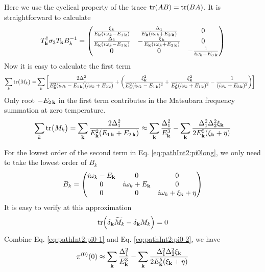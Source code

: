 Here we use the cyclical  property of the trace $\text{tr}(AB)=\text{tr}(BA)$.  
It is straightforward to calculate
\begin{equation*}
T_{\mathbf{k}}^{\dagger}\sigma_3T_{\mathbf{k}}B_{k}^{-1}=
\begin{pmatrix}
{\frac{\xi_{\ensuremath{\mathbf{k}}}}{E_{\ensuremath{\mathbf{k}}}(i\omega_{k}-E_{1\,\ensuremath{\mathbf{k}}})}}&\frac{\Delta_{1}}{E_{\mathbf{k}}(i\omega_{k}+E_{2\,\mathbf{k}})}&0\\
{\frac{\Delta_{1}}{E_{\mathbf{k}}(i\omega_{k}-E_{1\,\mathbf{k}})}}&-\frac{\xi_{\mathbf{k}}}{E_{\mathbf{k}}(i\omega_{k}+E_{2\,\mathbf{k}})}&0\\
0&0&-\frac{1}{i\omega_{k}+E_{3\,\mathbf{k}}}\\
\end{pmatrix}
\end{equation*}
Now it is easy to calculate the first term
\begin{equation}
\begin{split}
\sum_k\text{tr}\big(M_{k}\big)=&
\sum_{k}\left[
\frac{2\Delta_{1}^{2}}{E_{\mathbf{k}}^{2}(i\omega_{k}-E_{1\,\mathbf{k}})(i\omega_{k}+E_{2\,\mathbf{k}})}+
\left(\frac{\xi_{\mathbf{k}}^{2}}{E_{\mathbf{k}}^{2}(i\omega_{k}-E_{1\,\mathbf{k}})^{2}}+\frac{\xi_{\mathbf{k}}^{2}}{E_{\mathbf{k}}^{2}(i\omega_{k}+E_{1\,\mathbf{k}})^{2}}
-\frac{1}{(i\omega_{k}+E_{3\,\mathbf{k}})^{2}}\right)
\right]
\end{split}
\end{equation}
Only root $-E_{2\,\mathbf{k}}$ in the first term contributes in the Matsubara frequency summation at zero temperature.
\begin{equation}\label{eq:pathInt2:pi0-1}
\sum_k\text{tr}\big(M_{k}\big)=\sum_{\mathbf{k}}\frac{2\Delta_{1}^{2}}{E_{\mathbf{k}}^{2}(E_{1\,\mathbf{k}}+E_{2\,\mathbf{k}})}
\approx\sum_{\mathbf{k}}\frac{\Delta_{1}^{2}}{E_{\mathbf{k}}^{3}}-\sum_{\mathbf{k}}\frac{\Delta_{1}^{2}\Delta_{2}^{2}\xi_{\mathbf{k}}}{2E_{\mathbf{k}}^{5}(\xi_{\mathbf{k}}+\eta)}
\end{equation}

For the lowest order of the second term in Eq. \eqref{eq:pathInt2:pi0long}, we only need to take the lowest order of $B_{k}$
\begin{equation}
B_{k}=\begin{pmatrix}i\omega_{k}-E_{\mathbf{k}}&0&0\\0&i\omega_{k}+E_{\mathbf{k}}&0\\0&0&i\omega_{k}+\xi_{\mathbf{k}}+\eta\end{pmatrix}
\end{equation}
It is easy to verify at this approximation
\begin{equation}\label{eq:pathInt2:pi0-2}
\text{tr}\Big(\delta_{\mathbf{k}}\widetilde{M}_{k}-\delta_{\mathbf{k}}M_{k}\Big)=0
\end{equation}
Combine Eq. \eqref{eq:pathInt2:pi0-1} and Eq. \eqref{eq:pathInt2:pi0-2}, we have 
\begin{equation}
\pi^{(0)}(0)\approx\sum_{\mathbf{k}}\frac{\Delta_{1}^{2}}{E_{\mathbf{k}}^{3}}-\sum_{\mathbf{k}}\frac{\Delta_{1}^{2}\Delta_{2}^{2}\xi_{\mathbf{k}}}{2E_{\mathbf{k}}^{5}(\xi_{\mathbf{k}}+\eta)}\end{equation}

